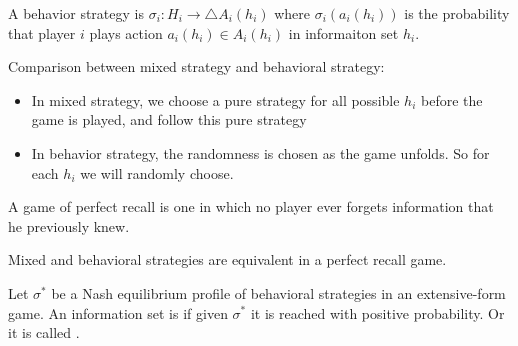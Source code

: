 \begin{definition}
    A behavior strategy is $\sigma_i: H_i \rightarrow \bigtriangleup A_i(h_i)$ where $\sigma_i (a_i (h_i))$ is the probability that player $i$ plays action $a_i (h_i) \in A_i(h_i)$  in informaiton set $h_i$.
\end{definition}

Comparison between mixed strategy and behavioral strategy:
\begin{itemize}
    \item In mixed strategy, we choose a pure strategy for all possible $h_i$ before the game is played, and follow this pure strategy
    \item In behavior strategy, the randomness is chosen as the game unfolds. So for each $h_i$ we will randomly choose.
\end{itemize}

\begin{definition}
    A game of perfect recall is one in which no player ever forgets information that he previously knew.
\end{definition}

\begin{theorem}
    Mixed and behavioral strategies are equivalent in a perfect recall game.    
\end{theorem}

\begin{definition}
    Let $\sigma^*$ be a Nash equilibrium profile of behavioral strategies in an extensive-form game. An information set is  if given $\sigma^*$ it is reached with positive probability. Or it is called .
\end{definition}






































